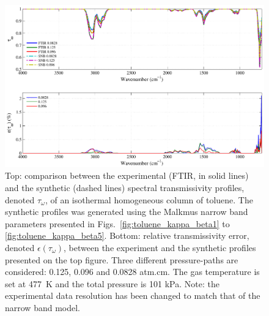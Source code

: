 \begin{figure}[p]
\includegraphics[width=\textwidth]{Figures/Comparison_Fit_Toluene_MALKMUS_Temp477K.pdf}
\caption{Top: comparison between the experimental (FTIR, in solid lines) and the synthetic (dashed lines) spectral transmissivity profiles, denoted $\tau_{\omega}$, of an isothermal homogeneous column of toluene. The synthetic profiles was generated using the Malkmus narrow band parameters presented in Figs.~\ref{fig:toluene_kappa_beta1} to \ref{fig:toluene_kappa_beta5}. Bottom: relative transmissivity error, denoted $\epsilon{(\tau_{\omega})}$, between the experiment and the synthetic profiles presented on the top figure. Three different pressure-paths are considered: 0.125, 0.096 and 0.0828 atm.cm. The gas temperature is set at 477~K and the total pressure is 101 kPa. Note: the experimental data resolution has been changed to match that of the narrow band model. \label{fig:toluene_SNBVerify_477K}}
\end{figure}


